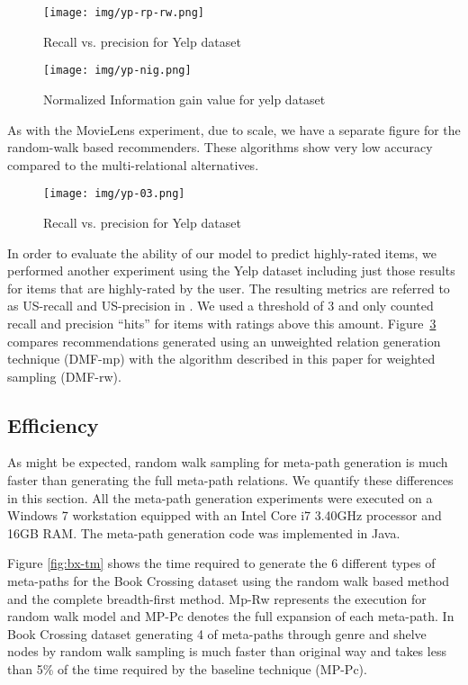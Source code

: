 \documentclass {acmart}
\begin{document}
\begin{figure}[tbh]
\centering
	\texttt{[image: img/yp-rp-rw.png]}
	\caption{\label{fig:yp-rp-rw}Recall vs. precision for Yelp dataset}
\end{figure}

\begin{figure}[tbh]
	\centering
	\texttt{[image: img/yp-nig.png]}
	\caption{\label{fig:yp-nig}Normalized Information gain value for yelp dataset}
\end{figure}

As with the MovieLens experiment, due to scale, we have a separate figure for the random-walk based recommenders. These algorithms show very low accuracy compared to the multi-relational alternatives.


\begin{figure}[tbh]
\centering
	\texttt{[image: img/yp-03.png]}
	\caption{\label{fig:yp-r3}Recall vs. precision for Yelp dataset}
\end{figure}
In order to evaluate the ability of our model to predict highly-rated items, we performed another experiment using the Yelp dataset including just those results for items that are highly-rated by the user. The resulting metrics are referred to as US-recall and US-precision in \cite{barbieri2012balancing}. We used a threshold of 3 and only counted recall and precision ``hits'' for items with ratings above this amount. Figure~\ref{fig:yp-r3} compares recommendations generated using an unweighted relation generation technique (DMF-mp) with the algorithm described in this paper for weighted sampling (DMF-rw). 

\subsection{Efficiency}

As might be expected, random walk sampling for meta-path generation is much faster than generating the full meta-path relations. We quantify these differences in this section. All the meta-path generation experiments were executed on a Windows 7 workstation equipped with an Intel Core i7 3.40GHz  processor and 16GB RAM. The meta-path generation code was implemented in Java.

Figure \ref{fig:bx-tm} shows the time required to generate the 6 different types of meta-paths for the Book Crossing dataset using the random walk based method and the complete breadth-first method. Mp-Rw represents the execution for random walk model and MP-Pc denotes the full expansion of each meta-path. In Book Crossing dataset generating 4 of meta-paths through genre and shelve nodes by random walk sampling is much faster than original way and takes less than 5\% of the time required by the baseline technique (MP-Pc).
\end{document}

